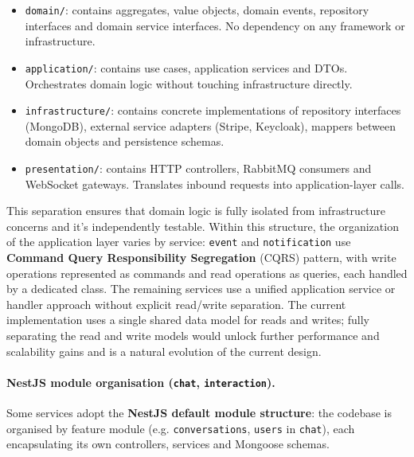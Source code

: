 \begin{itemize}
  \item \texttt{domain/}: contains aggregates, value objects, domain events, repository interfaces and domain service interfaces. No dependency on any framework or infrastructure.
  \item \texttt{application/}: contains use cases, application services and DTOs. Orchestrates domain logic without touching infrastructure directly.
  \item \texttt{infrastructure/}: contains concrete implementations of repository interfaces (MongoDB), external service adapters (Stripe, Keycloak), mappers between domain objects and persistence schemas.
  \item \texttt{presentation/}: contains HTTP controllers, RabbitMQ consumers and WebSocket gateways. Translates inbound requests into application-layer calls.
\end{itemize}

This separation ensures that domain logic is fully isolated from infrastructure concerns and it's independently testable. Within this structure, the organization of the application layer varies by service: \texttt{event} and \texttt{notification} use \textbf{Command Query Responsibility Segregation} (CQRS) pattern, with write operations represented as commands and read operations as queries, each handled by a dedicated class. The remaining services use a unified application service or handler approach without explicit read/write separation. The current implementation uses a single shared data model for reads and writes; fully separating the read and write models would unlock further performance and scalability gains and is a natural evolution of the current design.

\paragraph{NestJS module organisation (\texttt{chat}, \texttt{interaction}).}
Some services adopt the \textbf{NestJS default module structure}: the codebase is organised by feature module (e.g. \texttt{conversations}, \texttt{users} in \texttt{chat}), each encapsulating its own controllers, services and Mongoose schemas.
